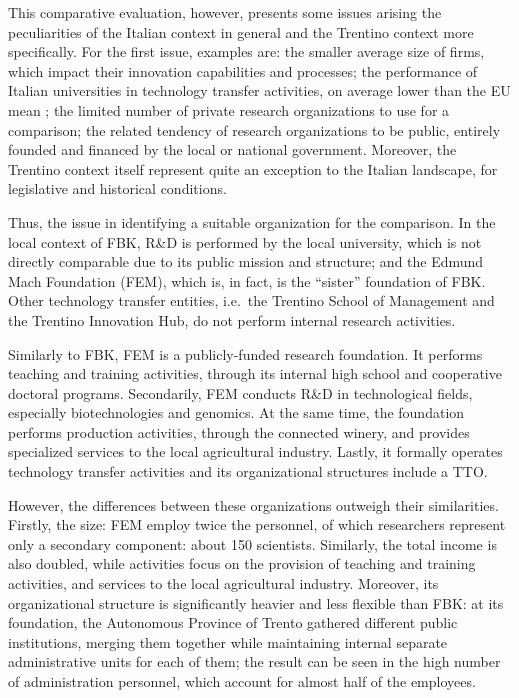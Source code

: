 This comparative evaluation, however, presents some issues arising the peculiarities of the Italian context in general and the Trentino context more specifically. For the first issue, examples are: the smaller average size of firms, which impact their innovation capabilities and processes; the performance of Italian universities in technology transfer activities, on average lower than the EU mean \citep{Balderi2007}; the limited number of private research organizations to use for a comparison; the related tendency of research organizations to be public, entirely founded and financed by the local or national government. Moreover, the Trentino context itself  represent quite an exception to the Italian landscape, for legislative and historical conditions. 

Thus, the issue in identifying a suitable organization for the comparison. In the local context of FBK, R\&D is performed by the local university, which is not directly comparable due to its public mission and structure; and the Edmund Mach Foundation (FEM), which is, in fact, is the \enquote{sister} foundation of FBK. Other technology transfer entities, i.e.\ the Trentino School of Management and the Trentino Innovation Hub, do not perform internal research activities.

Similarly to FBK, FEM is a publicly-funded research foundation. It performs teaching and training activities, through its internal high school and cooperative doctoral programs. Secondarily, FEM conducts R\&D in technological fields, especially  biotechnologies and genomics. At the same time, the foundation performs production activities, through the connected winery, and provides specialized services to the local agricultural industry. Lastly, it formally operates technology transfer activities and its organizational structures include a TTO.

However, the differences between these organizations outweigh their similarities. Firstly, the size: FEM employ twice the  personnel, of which researchers represent only a secondary component: about 150 scientists. Similarly, the total income is also doubled, while activities focus on the provision of teaching and training activities, and services to the local agricultural industry. Moreover, its organizational structure is significantly heavier and less flexible than FBK: at its foundation, the Autonomous Province of Trento gathered different public institutions, merging them together while maintaining internal separate administrative units for each of them; the result can be seen in the high number of administration personnel, which account for almost half of the employees. 

